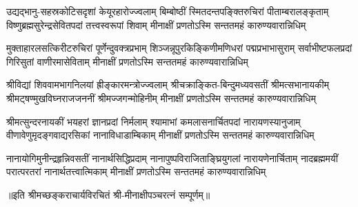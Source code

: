 

\fourlineindentedshloka
{उद्यद्भानु-सहस्रकोटिसदृशां केयूरहारोज्ज्वलाम्}
{बिम्बोष्ठीं स्मितदन्तपङ्क्तिरुचिरां पीताम्बरालङ्कृताम्‌}
{विष्णुब्रह्मसुरेन्द्रसेवितपदां तत्त्वस्वरूपां शिवाम्}
{मीनाक्षीं प्रणतोऽस्मि सन्ततमहं कारुण्यवारान्निधिम्‌}%

\fourlineindentedshloka
{मुक्ताहारलसत्किरीटरुचिरां पूर्णेन्दुवक्त्रप्रभाम्}
{शिञ्जन्नूपुरकिङ्किणीमणिधरां पद्मप्रभाभासुराम्‌}
{सर्वाभीष्टफलप्रदां गिरिसुतां वाणीरमासेविताम्}
{मीनाक्षीं प्रणतोऽस्मि सन्ततमहं कारुण्यवारान्निधिम्‌}%

\fourlineindentedshloka
{श्रीविद्यां शिववामभागनिलयां ह्रीङ्कारमन्त्रोज्ज्वलाम्}
{श्रीचक्राङ्कित-बिन्दुमध्यवसतीं श्रीमत्सभानायकीम्}
{श्रीमट्षण्मुखविघ्नराजजननीं श्रीमज्जगन्मोहिनीम्}
{मीनाक्षीं प्रणतोऽस्मि सन्ततमहं कारुण्यवारान्निधिम्}%

\fourlineindentedshloka
{श्रीमत्सुन्दरनायकीं भयहरां ज्ञानप्रदां निर्मलाम्‌}
{श्यामाभां कमलासनार्चितपदां नारायणस्यानुजाम्‌}
{वीणावेणुमृदङ्गवाद्यरसिकां नानाविधाडाम्बिकाम्}
{मीनाक्षीं प्रणतोऽस्मि सन्ततमहं कारुण्यवारान्निधिम्‌}%

\fourlineindentedshloka
{नानायोगिमुनीन्द्रहृन्निवसतीं नानार्थसिद्धिप्रदाम्‌}
{नानापुष्पविराजिताङ्घ्रियुगलां नारायणेनार्चिताम्‌}
{नादब्रह्ममयीं परात्परतरां नानार्थतत्त्वात्मिकाम्}
{मीनाक्षीं प्रणतोऽस्मि सन्ततमहं कारुण्यवारान्निधिम्‌}%

॥इति श्रीमच्छङ्कराचार्यविरचितं श्री-मीनाक्षीपञ्चरत्नं सम्पूर्णम्॥
